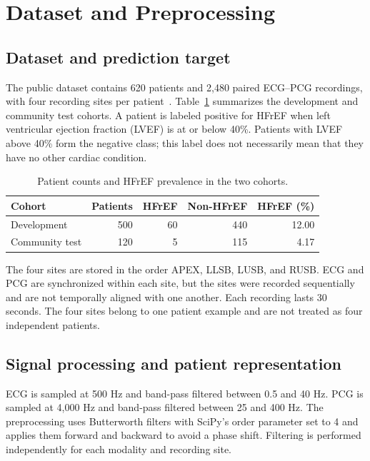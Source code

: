 \documentclass[11pt,a4paper]{article}
\begin{document}
\section{Dataset and Preprocessing}
\label{sec:data}

\subsection{Dataset and prediction target}
The public dataset contains 620 patients and 2,480 paired ECG--PCG
recordings, with four recording sites per patient~\cite{hfrefdataset}.
Table~\ref{tab:cohorts} summarizes the development and community test
cohorts. A patient is labeled positive for HFrEF when left ventricular
ejection fraction (LVEF) is at or below 40\%. Patients with LVEF above
40\% form the negative class; this label does not necessarily mean that
they have no other cardiac condition.

\begin{table}[htbp]
\centering
\caption{Patient counts and HFrEF prevalence in the two cohorts.}
\label{tab:cohorts}
\begin{tabular}{lrrrr}
\toprule
Cohort & Patients & HFrEF & Non-HFrEF & HFrEF (\%) \\
\midrule
Development & 500 & 60 & 440 & 12.00 \\
Community test & 120 & 5 & 115 & 4.17 \\
\bottomrule
\end{tabular}
\end{table}

The four sites are stored in the order APEX, LLSB, LUSB, and RUSB. ECG and
PCG are synchronized within each site, but the sites were recorded
sequentially and are not temporally aligned with one another. Each
recording lasts 30 seconds. The four sites belong to one patient example
and are not treated as four independent patients.

\subsection{Signal processing and patient representation}
ECG is sampled at 500 Hz and band-pass filtered between 0.5 and 40 Hz.
PCG is sampled at 4,000 Hz and band-pass filtered between 25 and 400 Hz.
The preprocessing uses Butterworth filters with SciPy's order parameter
set to 4 and applies them forward and backward to avoid a phase shift.
Filtering is performed independently for each modality and recording site.
\end{document}
